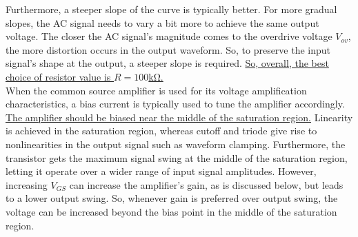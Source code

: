 Furthermore, a steeper slope of the curve is typically better. For more gradual slopes, the AC signal needs to vary a bit more to achieve the same output voltage. The closer the AC signal's magnitude comes to the overdrive voltage $V_{ov}$, the more distortion occurs in the output waveform. So, to preserve the input signal's shape at the output, a steeper slope is required. \uline{So, overall, the best choice of resistor value is $R = 100$\si{\kilo\ohm}.} \\

When the common source amplifier is used for its voltage amplification characteristics, a bias current is typically used to tune the amplifier accordingly. \uline{The amplifier should be biased near the middle of the saturation region.} Linearity is achieved in the saturation region, whereas cutoff and triode give rise to nonlinearities in the output signal such as waveform clamping. Furthermore, the transistor gets the maximum signal swing at the middle of the saturation region, letting it operate over a wider range of input signal amplitudes. However, increasing $V_{GS}$ can increase the amplifier's gain, as is discussed below, but leads to a lower output swing. So, whenever gain is preferred over output swing, the voltage can be increased beyond the bias point in the middle of the saturation region. \\
